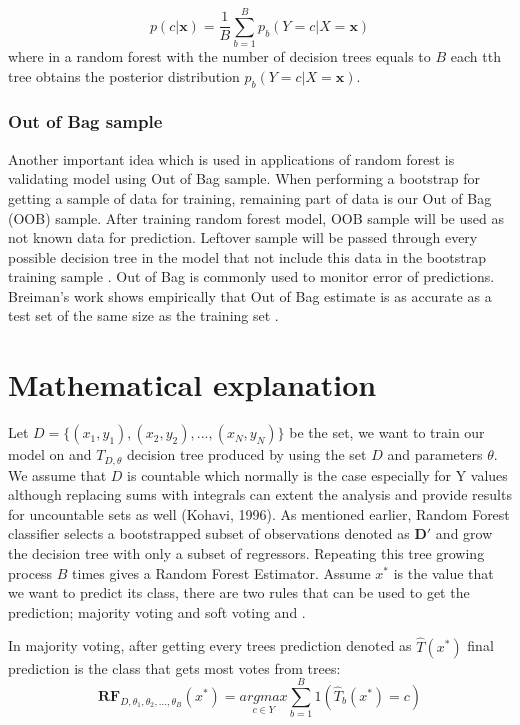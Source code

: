 \begin{equation}
	p(c|\textbf{x}) =  \frac{1}{B} \displaystyle\sum_{b=1}^{B} p_{b}(Y = c |X = \textbf{x})
\end{equation}
where in a random forest with the number of decision trees equals to $B$ each tth tree obtains the posterior 
distribution $ p_{b}(Y = c |X = \textbf{x}) $.

\subsubsection {Out of Bag sample}
Another important idea which is used in applications of random forest is validating model using Out of Bag sample.
When performing a bootstrap for getting a sample of data for training,
remaining part of data is our Out of Bag (OOB) sample.
After training random forest model, OOB sample will be used as not known data for prediction.
Leftover sample will be passed through every possible decision tree in the model that not include this
data in the bootstrap training sample \cite{friedman2001elements}. Out of Bag is commonly used to monitor error of predictions. 
Breiman’s work \cite{Breiman1996OUT-OF-BAG-E} shows empirically that Out of Bag estimate is as accurate 
as a test set of the same size as the training set \cite{Breiman1996OUT-OF-BAG-E}.


\section{Mathematical explanation}

Let $D = \{(x_{1},y_{1}), (x_{2}, y_{2}), ... , (x_{N}, y_{N})\}$ be the set, we want to train our model on and $T_{D, \theta}$ 
decision tree produced by using the set $D$ and parameters $\theta$. We assume that $D$ is countable which normally is the 
case especially for Y values although replacing sums with integrals can extent the analysis and 
provide results for uncountable sets as well (Kohavi, 1996). As mentioned earlier, 
Random Forest classifier selects a bootstrapped subset of observations denoted as $\boldsymbol{D'}$ and 
grow the decision tree with only a subset of regressors. Repeating this tree growing process $B$ times 
gives a Random Forest Estimator. Assume $x^*$ is the value that we want to predict its class, 
there are two rules that can be used to get the prediction; majority voting and 
soft voting \cite{louppe2014understanding} and \cite{Zhou2014DrugBank}.

In majority voting, after getting every trees prediction denoted as $\hat{T}(x^*)$ final prediction is the class that gets most votes from trees:
\begin{equation}
\boldsymbol{RF}_{D, \theta_{1}, \theta_{2}, ..., \theta_{B}} (x^*) =
	\underset{c \in Y}{argmax} \sum_{b = 1}^{B}{1(\hat{T}_{b}(x^*) = c)}
\end{equation}


